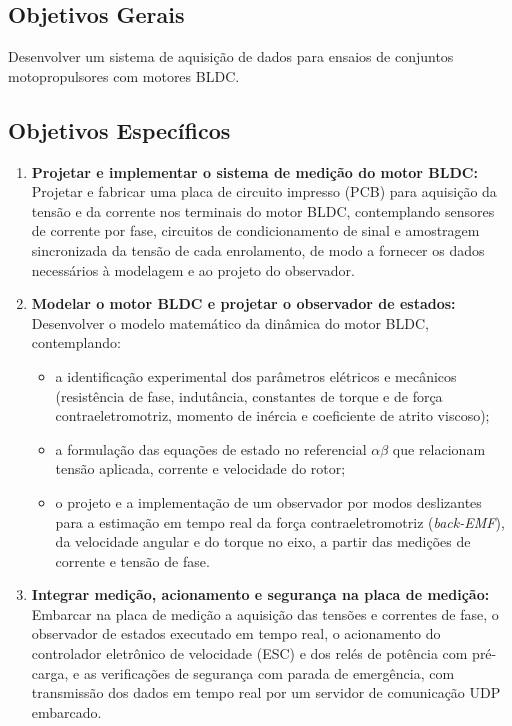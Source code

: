 \subsection{Objetivos Gerais}

Desenvolver um sistema de aquisição de dados para ensaios de conjuntos motopropulsores com motores BLDC.

\subsection{Objetivos Específicos}
\begin{enumerate}
    \item \textbf{Projetar e implementar o sistema de medição do motor BLDC:}
    Projetar e fabricar uma placa de circuito impresso (PCB) para aquisição da
    tensão e da corrente nos terminais do motor BLDC, contemplando sensores de
    corrente por fase, circuitos de condicionamento de sinal e amostragem
    sincronizada da tensão de cada enrolamento, de modo a fornecer os dados
    necessários à modelagem e ao projeto do observador.

    \item \textbf{Modelar o motor BLDC e projetar o observador de estados:}
    Desenvolver o modelo matemático da dinâmica do motor BLDC, contemplando:
    \begin{itemize}
        \item a identificação experimental dos parâmetros elétricos e mecânicos
        (resistência de fase, indutância, constantes de torque e de força
        contraeletromotriz, momento de inércia e coeficiente de atrito viscoso);
        \item a formulação das equações de estado no referencial $\alpha\beta$
        que relacionam tensão aplicada, corrente e velocidade do rotor;
        \item o projeto e a implementação de um observador por modos deslizantes
        para a estimação em tempo real da força contraeletromotriz
        (\textit{back-EMF}), da velocidade angular e do torque no eixo, a partir
        das medições de corrente e tensão de fase.
    \end{itemize}

    \item \textbf{Integrar medição, acionamento e segurança na placa de
    medição:} Embarcar na placa de medição a aquisição das tensões e correntes
    de fase, o observador de estados executado em tempo real, o acionamento do
    controlador eletrônico de velocidade (ESC) e dos relés de potência com
    pré-carga, e as verificações de segurança com parada de emergência, com
    transmissão dos dados em tempo real por um servidor de comunicação UDP
    embarcado.


\end{enumerate}
